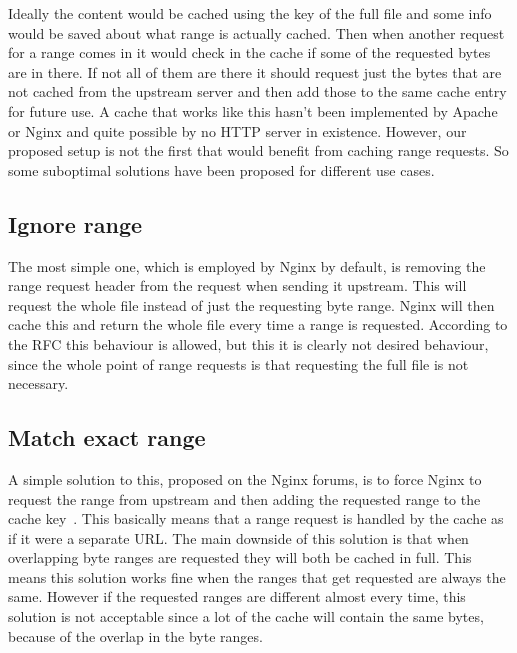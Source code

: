 \documentclass[twoside,openright]{uva-bachelor-thesis}
\begin{document}
Ideally the content would be cached using the key of the full file and some info
would be saved about what range is actually cached. Then when another request
for a range comes in it would check in the cache if some of the requested bytes
are in there. If not all of them are there it should request just the bytes that
are not cached from the upstream server and then add those to the same cache
entry for future use. A cache that works like this hasn't been implemented by
Apache or Nginx and quite possible by no HTTP server in existence. However, our
proposed setup is not the first that would benefit from caching range requests.
So some suboptimal solutions have been proposed for different use cases.

\subsection{Ignore range}
The most simple one, which is employed by Nginx by default, is removing the
range request header from the request when sending it upstream. This will
request the whole file instead of just the requesting byte range. Nginx will
then cache this and return the whole file every time a range is requested.
According to the RFC this behaviour is allowed, but this it is clearly not
desired behaviour, since the whole point of range requests is that requesting
the full file is not necessary.

\subsection{Match exact range}
A simple solution to this, proposed on the Nginx forums, is to force Nginx to
request the range from upstream and then adding the requested range to the cache
key~\autocite{nginxcacheforum}. This basically means that a range request is
handled by the cache as if it were a separate URL\@. The main downside of this
solution is that when overlapping byte ranges are requested they will both be
cached in full.  This means this  solution works fine when the ranges that get
requested are always the same. However if the requested ranges are different
almost every time, this solution is not acceptable since a lot of the cache will
contain the same bytes, because of the overlap in the byte ranges.

\end{document}
